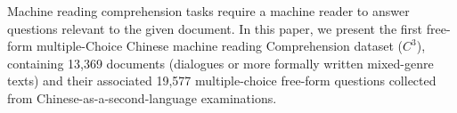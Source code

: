 Machine reading comprehension tasks require a machine reader to answer questions relevant to the given document. In this paper, we present the first free-form multiple-Choice Chinese machine reading Comprehension dataset ($C^3$), containing 13,369 documents (dialogues or more formally written mixed-genre texts) and their associated 19,577 multiple-choice free-form questions collected from Chinese-as-a-second-language examinations.